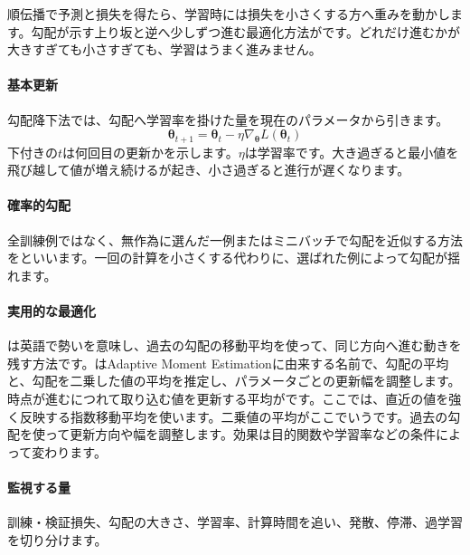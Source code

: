 順伝播で予測と損失を得たら、学習時には損失を小さくする方へ重みを動かします。勾配が示す上り坂と逆へ少しずつ進む最適化方法がです。どれだけ進むかが大きすぎても小さすぎても、学習はうまく進みません。

\begingroup
\begingroup
\paragraph{基本更新}
        勾配降下法では、勾配へ学習率を掛けた量を現在のパラメータから引きます。
        \[
          \boldsymbol{\theta}_{t+1}
          =\boldsymbol{\theta}_{t}
          -\eta\nabla_{\boldsymbol{\theta}}
          L(\boldsymbol{\theta}_{t})
        \]
        下付きの$t$は何回目の更新かを示します。$\eta$は学習率です。大き過ぎると最小値を飛び越して値が増え続けるが起き、小さ過ぎると進行が遅くなります。

\paragraph{確率的勾配}
        全訓練例ではなく、無作為に選んだ一例またはミニバッチで勾配を近似する方法をといいます。一回の計算を小さくする代わりに、選ばれた例によって勾配が揺れます。

\par
\endgroup
\medskip
\begingroup
\paragraph{実用的な最適化}
        は英語で勢いを意味し、過去の勾配の移動平均を使って、同じ方向へ進む動きを残す方法です。はAdaptive Moment Estimationに由来する名前で、勾配の平均と、勾配を二乗した値の平均を推定し、パラメータごとの更新幅を調整します。時点が進むにつれて取り込む値を更新する平均がです。ここでは、直近の値を強く反映する指数移動平均を使います。二乗値の平均がここでいうです。過去の勾配を使って更新方向や幅を調整します。効果は目的関数や学習率などの条件によって変わります。

\paragraph{監視する量}
        訓練・検証損失、勾配の大きさ、学習率、計算時間を追い、発散、停滞、過学習を切り分けます。

\par
\endgroup
\par
\endgroup


